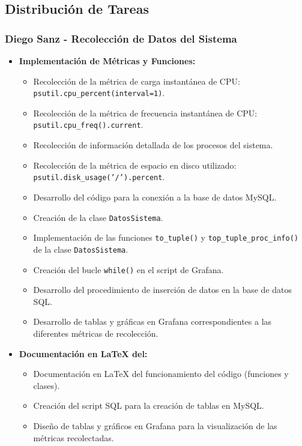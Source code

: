 \documentclass{article}
\begin{document}
\subsection{Distribución de Tareas}

\subsubsection{Diego Sanz - Recolección de Datos del Sistema}

\begin{itemize}
    \item \textbf{Implementación de Métricas y Funciones:}
    \begin{itemize}
        \item Recolección de la métrica de carga instantánea de CPU: \texttt{psutil.cpu\_percent(interval=1)}.
        \item Recolección de la métrica de frecuencia instantánea de CPU: \texttt{psutil.cpu\_freq().current}.
        \item Recolección de información detallada de los procesos del sistema.
        \item Recolección de la métrica de espacio en disco utilizado: \texttt{psutil.disk\_usage('/').percent}.
        \item Desarrollo del código para la conexión a la base de datos MySQL.
        \item Creación de la clase \texttt{DatosSistema}.
        \item Implementación de las funciones \texttt{to\_tuple()} y \texttt{top\_tuple\_proc\_info()} de la clase \texttt{DatosSistema}.
        \item Creación del bucle \texttt{while()} en el script de Grafana.
        \item Desarrollo del procedimiento de inserción de datos en la base de datos SQL.
        \item Desarrollo de tablas y gráficas en Grafana correspondientes a las diferentes métricas de recolección.
    \end{itemize}
    \item \textbf{Documentación en \LaTeX{} del:}
    \begin{itemize}
        \item Documentación en \LaTeX{} del funcionamiento del código (funciones y clases).
        \item Creación del script SQL para la creación de tablas en MySQL.
        \item Diseño de tablas y gráficos en Grafana para la visualización de las métricas recolectadas.
    \end{itemize}
\end{itemize}
\end{document}
